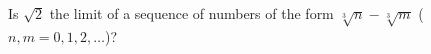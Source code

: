 Is $\sqrt{2}$ the limit of a sequence of numbers of the form
$\sqrt[3]{n} - \sqrt[3]{m}$ ($n,m = 0, 1, 2, \dots$)?
